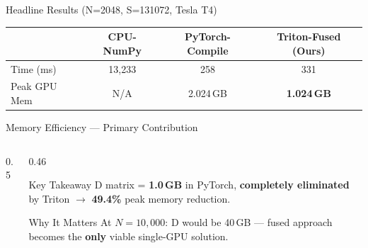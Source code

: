 \documentclass[aspectratio=169, 11pt]{beamer}
\newcommand{\highlight}[1]{\textcolor{accent}{\textbf{#1}}}
\begin{document}
\begin{frame}{Headline Results (N=2048, S=131072, Tesla T4)}
\vspace{0.3em}
\begin{center}
\footnotesize
\begin{tabular}{lccc}
\toprule
& \textbf{CPU-NumPy} & \textbf{PyTorch-Compile} & \textbf{Triton-Fused (Ours)} \\
\midrule
Time (ms) & 13{,}233 & 258 & 331 \\
Peak GPU Mem & N/A & 2.024\,GB & \highlight{1.024\,GB} \\
\bottomrule
\end{tabular}
\end{center}
\end{frame}

\begin{frame}{Memory Efficiency --- Primary Contribution}
\begin{columns}[T]
\begin{column}{0.5\textwidth}
\begin{center}
\end{center}
\end{column}
\begin{column}{0.46\textwidth}
\vspace{0.3cm}
\begin{block}{Key Takeaway}
\small
D matrix = \highlight{1.0\,GB} in PyTorch, \textbf{completely eliminated} by Triton $\to$ \highlight{49.4\%} peak memory reduction.
\end{block}
\vspace{0.3em}
\begin{block}{Why It Matters}
\small
At $N{=}10{,}000$: D would be 40\,GB --- fused approach becomes the \textbf{only} viable single-GPU solution.
\end{block}
\end{column}
\end{columns}
\end{frame}
\end{document}
